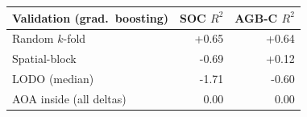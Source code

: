 \begin{tabular}{lrr}
\toprule
Validation (grad.\ boosting) & SOC $R^2$ & AGB-C $R^2$ \\
\midrule
Random $k$-fold & +0.65 & +0.64 \\
Spatial-block & -0.69 & +0.12 \\
LODO (median) & -1.71 & -0.60 \\
AOA inside (all deltas) & 0.00 & 0.00 \\
\bottomrule
\end{tabular}
